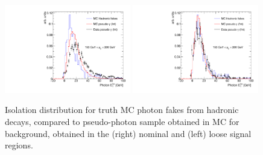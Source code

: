 
\begin{figure}[h]
  \begin{center}
    \includegraphics[width=0.49\textwidth]{figures/bkg_mc_pseudo_data_SR_l_ptbin}
    \includegraphics[width=0.49\textwidth]{figures/bkg_mc_pseudo_data_SR_lp_ptbin}
    \caption{Isolation distribution for truth MC photon fakes from hadronic decays, compared to pseudo-photon
      sample obtained in MC for background, obtained in the (right) nominal and (left) loose signal regions.}
  \label{fig:jetfake_mc_data}
  \end{center}
\end{figure}

